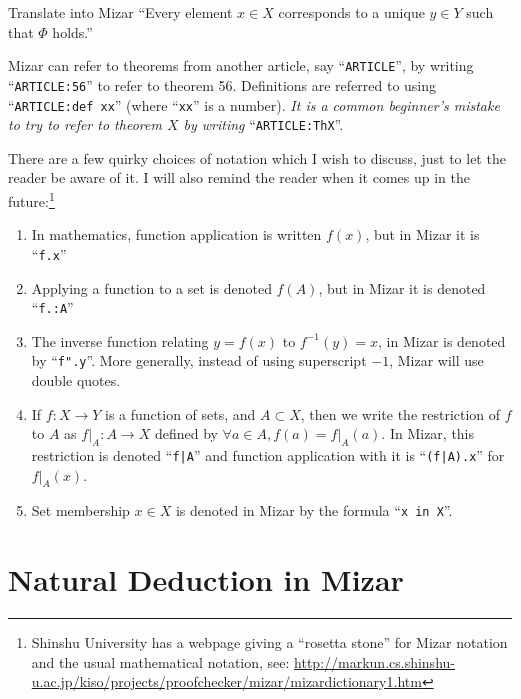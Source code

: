 \begin{exercise}
  Translate into Mizar ``Every element $x\in X$ corresponds to a unique
  $y\in Y$ such that $\Phi$ holds.''
\end{exercise}

\label{par:introduction:referring-to-labels}
Mizar can refer to theorems from another article, say
``\verb#ARTICLE#'', by writing ``\verb#ARTICLE:56#'' to refer to theorem 56.
Definitions are referred to using ``\verb#ARTICLE:def xx#'' (where
``\verb#xx#'' is a number). \emph{It is a common beginner's mistake to
try to refer to theorem $X$ by writing } ``\verb#ARTICLE:ThX#''.

There are a few quirky choices of notation which I wish to discuss, just
to let the reader be aware of it. I will also remind the reader when it
comes up in the future:\footnote{Shinshu University has a webpage giving
a ``rosetta stone'' for Mizar notation and the usual mathematical
notation, see: \url{http://markun.cs.shinshu-u.ac.jp/kiso/projects/proofchecker/mizar/mizardictionary1.htm}}

\begin{enumerate}
\item{} In mathematics, function application is written $f(x)$, but in
  Mizar it is ``\texttt{f.x}''
\item{} Applying a function to a set is denoted $f(A)$, but in Mizar it is
  denoted ``\texttt{f.:A}''
\item{} The inverse function relating $y=f(x)$ to $f^{-1}(y)=x$, in Mizar
  is denoted by ``\texttt{f".y}''. More generally, instead of using
  superscript $-1$, Mizar will use double quotes.
\item{} If $f\colon X\to Y$ is a function of sets, and $A\subset X$, then
  we write the restriction of $f$ to $A$ as $f|_{A}\colon A\to X$
  defined by $\forall a\in A, f(a)=f|_{A}(a)$. In Mizar, this
  restriction is denoted ``\verb#f|A#'' and function application with it
  is ``\verb#(f|A).x#'' for $f|_{A}(x)$.
\item{} Set membership $x\in X$ is
  denoted in Mizar by the formula ``\verb#x in X#''.
\end{enumerate}

\section{Natural Deduction in Mizar}

